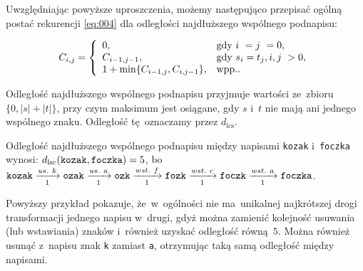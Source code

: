 \documentclass{praca1}
\begin{document}
\begin{definition}
Uwzględniając powyższe uproszczenia, możemy następująco przepisać ogólną postać rekurencji \eqref{eq:004} dla odległości najdłuższego wspólnego podnapisu:

\begin{equation*}
C_{i,j} = \left\{
\begin{array}{l l}     
    0, & \text{gdy } i~= j~= 0, \\
    C_{i-1, j-1}, & \text{gdy } s_i = t_j, i, j~> 0,  \\
    1 + \min\{C_{i-1, j}, C_{i, j-1}\}, & \text{wpp.}. \\    
\end{array}\right.
\end{equation*}
\end{definition}


Odległość najdłuższego wspólnego podnapisu przyjmuje wartości ze~zbioru $\{0, |s|+|t|\}$, przy czym maksimum jest osiągane, gdy $s$ i~$t$ nie mają ani jednego wspólnego znaku. Odległość tę~oznaczamy przez $d_{\mathrm{lcs}}$.

\begin{example}
Odległość najdłuższego wspólnego podnapisu między napisami \verb|kozak| i~\verb|foczka| wynosi: $d_{\mathrm{lsc}}(\verb|kozak|, \verb|foczka|) = 5$, bo~$\verb|kozak|\xrightarrow[1]{us.\ k} \verb|ozak| \xrightarrow[1]{us.\ a} \verb|ozk| \xrightarrow[1]{wst.\ f} \verb|fozk| \xrightarrow[1]{wst.\ c} \verb|foczk| \xrightarrow[1]{wst.\ a} \verb|foczka|$.
\end{example}

Powyższy przykład pokazuje, że~w~ogólności nie ma~unikalnej najkrótszej drogi transformacji jednego napisu w~drugi, gdyż można zamienić kolejność usuwania (lub wstawiania) znaków i~również uzyskać odległość równą~$5$. Można również usunąć z~napisu znak \verb|k| zamiast \verb|a|, otrzymując taką samą odległość między napisami.
\end{document}
